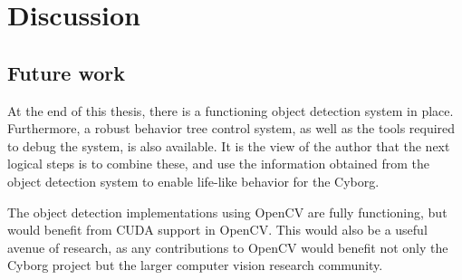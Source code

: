 \documentclass[\rootfolder/main.tex]{subfiles}
\begin{document}
\chapter{Discussion} %
\label{ch:discussion} %





\section{Future work}


At the end of this thesis, there is a functioning object detection system in place.
Furthermore, a robust behavior tree control system, as well as the tools required to debug the system, is also available.
It is the view of the author that the next logical steps is to combine these, and use the information obtained from the object detection system to enable life-like behavior for the Cyborg.

The object detection implementations using OpenCV are fully functioning, but would benefit from CUDA support in OpenCV.
This would also be a useful avenue of research, as any contributions to OpenCV would benefit not only the Cyborg project but the larger computer vision research community.
\end{document}

